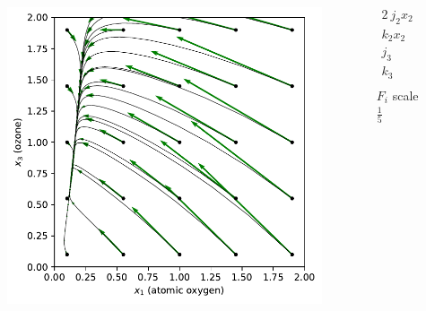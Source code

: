 \begin{columns}
\begin{column}{0.65\textwidth}
\vspace{-0.35in}
\begin{figure}
\includegraphics[scale=0.65]{../plots/chapman_fast.pdf}
\end{figure}
\end{column}
\begin{column}{0.35\textwidth}
\vspace{-0.35in}
\begin{align*}
2 \ j_2 x_2 &= 0.1 \\
k_2 x_2 &= 2.0 \\
j_3 &= 0.3 \\
k_3 &= 0.5 \\
\end{align*}
\hspace{0.4in} $F_i$ scale $\frac{1}{5}$
\end{column}
\end{columns}
